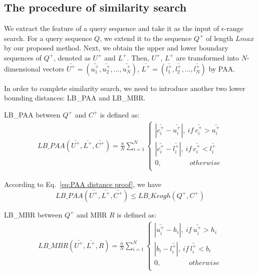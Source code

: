 \documentclass[10pt,journal,compsoc]{IEEEtran}
\begin{document}
\subsection{The procedure of similarity search}\label{sec:similarity search procedure}

We extract the feature of a query sequence and take it as the input of $\epsilon$-range search.
For a query sequence $Q$,
we extend it to the sequence $Q^+$ of length $Lmax$ by our proposed method.
Next, we obtain the upper and lower boundary sequences of $Q^+$,
denoted as $U^+$ and $L^+$.
Then, $U^+$, $L^+$ are transformed into $N$-dimensional vectors
$\bar{U^+}=(\bar{u^+_1}, \bar{u^+_2},\ldots,\bar{u^+_N})$, $\bar{L^+}=(\bar{l^+_1}, \bar{l^+_2},\ldots,\bar{l^+_N})$ by PAA.

In order to complete similarity search,
we need to introduce another two lower bounding distances: LB\_PAA and LB\_MBR.

LB\_PAA between $Q^+$ and $C^+$ is defined as:
\begin{equation}\label{eq:LBPAA}
\begin{split}
	LB\_{PAA}(\bar{U^+},\bar{L^+},\bar{C^+})=
	\frac{n}{N} \sum\limits_{i=1}^{N}  \left\{ {\begin{array}{l}
    |\bar{c^+_i} - \bar{u^+_i}|, \ if \  \bar{c^+_i}>\bar{u^+_i}\\
    |\bar{c^+_i}-\bar{l^+_i}|,   \ if \  \bar{c^+_i}<\bar{l^+_i} \\
    0,  \quad \quad \quad \quad otherwise \\
 \end{array}} \right.
\end{split}
\end{equation}

According to  Eq.~\eqref{eq:PAA distance proof}, we have
\begin{equation}\label{eq:lower boundary of Keogh PAA}
 LB\_{PAA}(\bar{U^+},\bar{L^+},\bar{C^+}) \leq LB\_Keogh(Q^+,C^+)
\end{equation}

LB\_MBR between $Q^+$ and MBR $R$ is defined as:
\begin{equation}\label{eq:LBPAAextend}
\begin{split}
	LB\_MBR(\bar{U^+},\bar{L^+},R)=
	\frac{n}{N} \sum\limits_{i=1}^{N}  \left\{ {\begin{array}{l}
    |\bar{u^+_i} - h_i|, \ if \  \bar{u^+_i}>h_i\\
    |b_i-\bar{l^+_i}|,   \ if \  \bar{l^+_i}<b_i \\
    0,  \quad \quad \quad \quad otherwise \\
 \end{array}} \right.
\end{split}
\end{equation}
\end{document}

